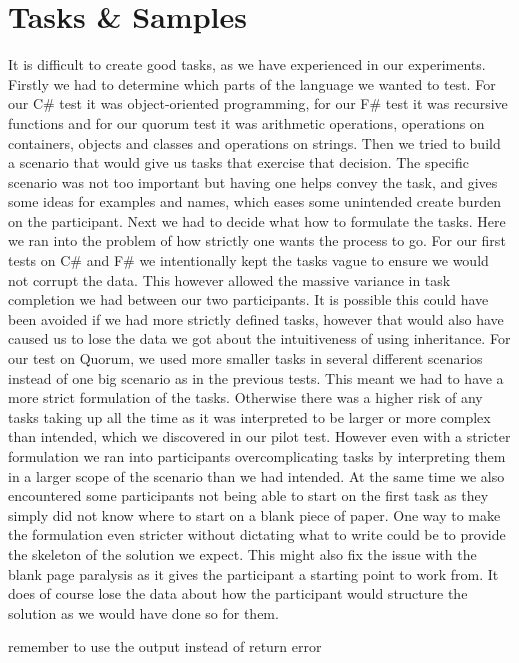 \section{Tasks \& Samples}
It is difficult to create good tasks, as we have experienced in our experiments.
Firstly we had to determine which parts of the language we wanted to test.
For our C\# test it was object-oriented programming, for our F\# test it was recursive functions and for our quorum test it was arithmetic operations, operations on containers, objects and classes and operations on strings.
Then we tried to build a scenario that would give us tasks that exercise that decision.
The specific scenario was not too important but having one helps convey the task, and gives some ideas for examples and names, which eases some unintended create burden on the participant.
Next we had to decide what how to formulate the tasks.
Here we ran into the problem of how strictly one wants the process to go.
For our first tests on C\# and F\# we intentionally kept the tasks vague to ensure we would not corrupt the data.
This however allowed the massive variance in task completion we had between our two participants.
It is possible this could have been avoided if we had more strictly defined tasks, however that would also have caused us to lose the data we got about the intuitiveness of using inheritance.
For our test on Quorum, we used more smaller tasks in several different scenarios instead of one big scenario as in the previous tests.
This meant we had to have a more strict formulation of the tasks.
Otherwise there was a higher risk of any tasks taking up all the time as it was interpreted to be larger or more complex than intended, which we discovered in our pilot test.
However even with a stricter formulation we ran into participants overcomplicating tasks by interpreting them in a larger scope of the scenario than we had intended.
At the same time we also encountered some participants not being able to start on the first task as they simply did not know where to start on a blank piece of paper.
One way to make the formulation even stricter without dictating what to write could be to provide the skeleton of the solution we expect.
This might also fix the issue with the blank page paralysis as it gives the participant a starting point to work from.
It does of course lose the data about how the participant would structure the solution as we would have done so for them.


remember to use the output instead of return error